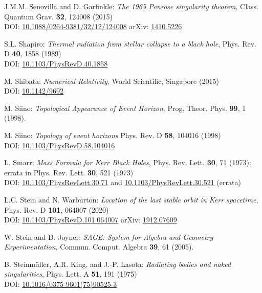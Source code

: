 \begin{thebibliography}{123}
J.M.M. Senovilla and D. Garfinkle:
{\em The 1965 Penrose singularity theorem},
Class. Quantum Grav. {\bf 32}, 124008 (2015)\\
DOI: \href{https://doi.org/10.1088/0264-9381/32/12/124008}{10.1088/0264-9381/32/12/124008}\hfill
arXiv: \href{https://arxiv.org/abs/1410.5226}{1410.5226}

S.L. Shapiro:
{\em Thermal radiation from stellar collapse to a black hole},
Phys. Rev. D {\bf 40}, 1858 (1989)\\
DOI: \href{https://doi.org/10.1103/PhysRevD.40.1858}{10.1103/PhysRevD.40.1858}

M. Shibata:
{\em Numerical Relativity},
World Scientific, Singapore (2015)\\
DOI: \href{https://doi.org/10.1142/9692}{10.1142/9692}

M. Siino: {\em Topological Appearance of Event Horizon},
Prog. Theor. Phys. {\bf 99}, 1 (1998).

M. Siino: {\em Topology of event horizons}
Phys. Rev. D {\bf 58}, 104016 (1998)\\
DOI: \href{https://doi.org/10.1103/PhysRevD.58.104016}{10.1103/PhysRevD.58.104016}

L. Smarr: {\em Mass Formula for Kerr Black Holes},
Phys. Rev. Lett. {\bf 30}, 71 (1973); errata in Phys. Rev. Lett. {\bf 30}, 521 (1973)\\
DOI: \href{https://doi.org/10.1103/PhysRevLett.30.71}{10.1103/PhysRevLett.30.71}
and
\href{https://doi.org/10.1103/PhysRevLett.30.521}{10.1103/PhysRevLett.30.521} (errata)

L.C. Stein and N. Warburton:
{\em Location of the last stable orbit in Kerr spacetime},
Phys. Rev. D  {\bf 101}, 064007 (2020)\\
DOI: \href{https://doi.org/10.1103/PhysRevD.101.064007}{10.1103/PhysRevD.101.064007}\hfill
arXiv: \href{https://arxiv.org/abs/1912.07609}{1912.07609}

W. Stein and D. Joyner: {\em SAGE: System for Algebra and Geometry Experimentation},
Commun. Comput. Algebra {\bf 39}, 61 (2005).

B. Steinmüller, A.R. King, and J.-P. Lasota:
{\em Radiating bodies and naked singularities},
Phys. Lett. A {\bf 51}, 191 (1975)\\
DOI: \href{https://doi.org/10.1016/0375-9601(75)90525-3}{10.1016/0375-9601(75)90525-3}


\end{thebibliography}
